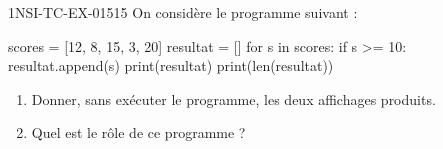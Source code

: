 \begin{exercice}{1NSI-TC-EX-015}{1}{5}
On considère le programme suivant :
\begin{python}
scores = [12, 8, 15, 3, 20]
resultat = []
for s in scores:
    if s >= 10:
        resultat.append(s)
print(resultat)
print(len(resultat))
\end{python}
\begin{enumerate}
  \item Donner, sans exécuter le programme, les deux affichages produits.
  \item Quel est le rôle de ce programme ?
\end{enumerate}
\end{exercice}
